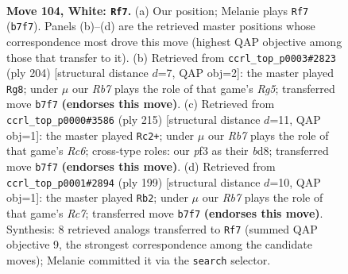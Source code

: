 \documentclass[11pt]{article}
\begin{document}
\clearpage

\begin{figure}[p]\centering
\begin{subfigure}{0.46\textwidth}\centering
\resizebox{\linewidth}{!}{%
\newchessgame
\chessboard[
  setfen={1B5k/1R6/8/7P/8/4rp2/8/3K4 w - - 0 104},
  showmover=false,
  pgfstyle=straightmove, color=movearrow, markmove={b7-f7}
]}
\caption{}
\end{subfigure}\hfill
\begin{subfigure}{0.46\textwidth}\centering
\resizebox{\linewidth}{!}{%
\newchessgame
\chessboard[
  setfen={8/4k3/4p3/4B1R1/8/8/4K3/7r w - - 1 103},
  showmover=false,
  pgfstyle=straightmove, color=movearrow, markmove={g5-g8}
]}
\caption{}
\end{subfigure}
\\[4pt]
\begin{subfigure}{0.46\textwidth}\centering
\resizebox{\linewidth}{!}{%
\newchessgame
\chessboard[
  setfen={3B4/k7/8/7b/1R5P/2r5/5K2/8 b - - 23 108},
  showmover=false,
  pgfstyle=straightmove, color=movearrow, markmove={c3-c2}
]}
\caption{}
\end{subfigure}\hfill
\begin{subfigure}{0.46\textwidth}\centering
\resizebox{\linewidth}{!}{%
\newchessgame
\chessboard[
  setfen={1R6/1P5k/3K4/8/7P/8/2r5/8 b - - 12 100},
  showmover=false,
  pgfstyle=straightmove, color=movearrow, markmove={c2-b2}
]}
\caption{}
\end{subfigure}
\caption{\textbf{Move 104, White: \texttt{Rf7}.} (a) Our position; Melanie plays \texttt{Rf7} (\texttt{b7f7}). Panels (b)--(d) are the retrieved master positions whose correspondence most drove this move (highest QAP objective among those that transfer to it). (b) Retrieved from \texttt{ccrl\_top\_p0003\#2823} (ply 204) [structural distance $d$=7, QAP obj=2]: the master played \texttt{Rg8}; under $\mu$ our \emph{Rb7} plays the role of that game's \emph{Rg5}; transferred move \texttt{b7f7} \textbf{(endorses this move)}. (c) Retrieved from \texttt{ccrl\_top\_p0000\#3586} (ply 215) [structural distance $d$=11, QAP obj=1]: the master played \texttt{Rc2+}; under $\mu$ our \emph{Rb7} plays the role of that game's \emph{Rc6}; cross-type roles: our \emph{p}f3 as their \emph{b}d8; transferred move \texttt{b7f7} \textbf{(endorses this move)}. (d) Retrieved from \texttt{ccrl\_top\_p0001\#2894} (ply 199) [structural distance $d$=10, QAP obj=1]: the master played \texttt{Rb2}; under $\mu$ our \emph{Rb7} plays the role of that game's \emph{Rc7}; transferred move \texttt{b7f7} \textbf{(endorses this move)}. Synthesis: 8 retrieved analogs transferred to \texttt{Rf7} (summed QAP objective 9, the strongest correspondence among the candidate moves); Melanie committed it via the \texttt{search} selector.}
\label{fig:thought-m206}
\end{figure}
\end{document}
